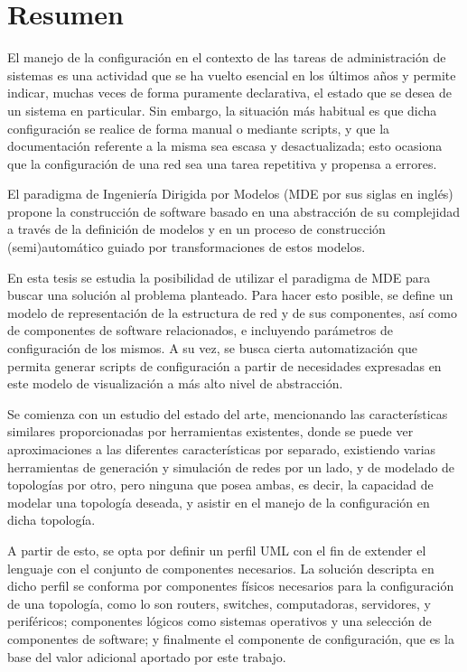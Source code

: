 \chapter*{Resumen}

El manejo de la configuración en el contexto de las tareas de administración de sistemas es una actividad que se ha vuelto esencial en los últimos años y permite indicar, muchas veces de forma puramente declarativa, el estado que se desea de un sistema en particular.
Sin embargo, la situación más habitual es que dicha configuración se realice de forma manual o mediante scripts, y que la documentación referente a la misma sea escasa y desactualizada; esto ocasiona que la configuración de una red sea una tarea repetitiva y propensa a errores.

El paradigma de Ingeniería Dirigida por Modelos (MDE por sus siglas en inglés) propone la construcción de software basado en una abstracción de su complejidad a través de la definición de modelos y en un proceso de construcción (semi)automático guiado por transformaciones de estos modelos.

En esta tesis se estudia la posibilidad de utilizar el paradigma de MDE para buscar una solución al problema planteado. Para hacer esto posible, se define un modelo de representación de la estructura de red y de sus componentes, así como de componentes de software relacionados, e incluyendo parámetros de configuración de los mismos. A su vez, se busca cierta automatización que permita generar scripts de configuración a partir de necesidades expresadas en este modelo de visualización a más alto nivel de abstracción.

Se comienza con un estudio del estado del arte, mencionando las características similares proporcionadas por herramientas existentes, donde se puede ver aproximaciones a las diferentes características por separado, existiendo varias herramientas de generación y simulación de redes por un lado, y de modelado de topologías por otro, pero ninguna que posea ambas, es decir, la capacidad de modelar una topología deseada, y asistir en el manejo de la configuración en dicha topología.

A partir de esto, se opta por definir un perfil UML con el fin de extender el lenguaje con el conjunto de componentes necesarios. La solución descripta en dicho perfil se conforma por componentes físicos necesarios para la configuración de una topología, como lo son routers, switches, computadoras, servidores, y periféricos; componentes lógicos como sistemas operativos y una selección de componentes de software; y finalmente el componente de configuración, que es la base del valor adicional aportado por este trabajo.

